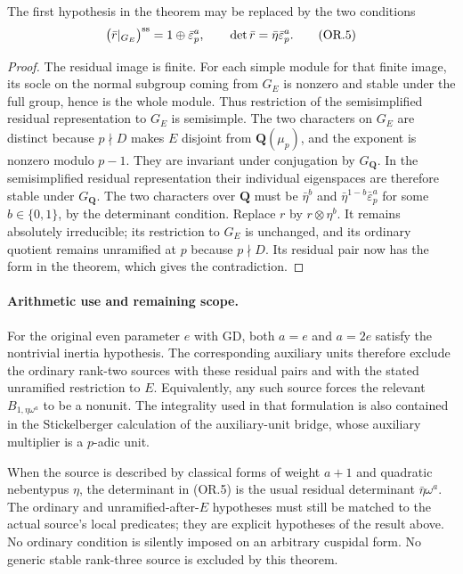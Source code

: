 \begin{corollary}
The first hypothesis in the theorem may be replaced
by the two conditions
\[
 \bigl(\bar r|_{G_E}\bigr)^{\rm ss}
                  =1\oplus\bar\varepsilon_p^a,
 \qquad \det\bar r=\bar\eta\bar\varepsilon_p^a.          \tag{OR.5}
\]
\end{corollary}
\begin{proof}
The residual image is finite.  For each simple
module for that finite image, its socle on the
normal subgroup coming from $G_E$ is nonzero and
stable under the full group, hence is the whole
module.  Thus restriction of the semisimplified
residual representation to $G_E$ is semisimple.
The two characters on $G_E$ are distinct because
$p\nmid D$ makes $E$ disjoint from
$\mathbf Q(\mu_p)$, and the exponent is nonzero
modulo $p-1$.  They are invariant under conjugation
by $G_{\mathbf Q}$.  In the semisimplified residual
representation their individual eigenspaces are
therefore stable under $G_{\mathbf Q}$.  The two
characters over $\mathbf Q$ must be
$\bar\eta^b$ and
$\bar\eta^{1-b}\bar\varepsilon_p^a$ for some
$b\in\{0,1\}$, by the determinant condition.
Replace $r$ by $r\otimes\eta^b$.
It remains absolutely irreducible; its restriction
to $G_E$ is unchanged, and its ordinary quotient
remains unramified at $p$ because $p\nmid D$.
Its residual pair now has the form in the theorem,
which gives the contradiction.
\end{proof}

\paragraph{Arithmetic use and remaining scope.}
For the original even parameter $e$ with GD,
both $a=e$ and $a=2e$ satisfy the nontrivial
inertia hypothesis.  The corresponding auxiliary
units therefore exclude the ordinary rank-two
sources with these residual pairs and with the
stated unramified restriction to $E$.
Equivalently, any such source forces the relevant
$B_{1,\eta\omega^a}$ to be a nonunit.
The integrality used in that formulation is also
contained in the Stickelberger calculation of
the auxiliary-unit bridge, whose auxiliary
multiplier is a $p$-adic unit.

When the source is described by classical forms
of weight $a+1$ and quadratic nebentypus $\eta$,
the determinant in (OR.5) is the usual residual
determinant $\bar\eta\omega^a$.  The ordinary and
unramified-after-$E$ hypotheses must still be
matched to the actual source's local predicates;
they are explicit hypotheses of the result above.
No ordinary condition is silently imposed on
an arbitrary cuspidal form.  No generic stable
rank-three source is excluded by this theorem.

